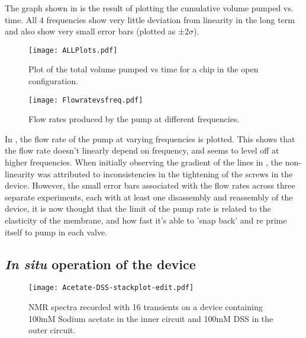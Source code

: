 The graph shown in  is the result of plotting the cumulative volume pumped
vs. time. All 4 frequencies show very little deviation from linearity in the
long term and also show very small error bars (plotted as ±2$\sigma$).

\begin{figure}[ht]
  \begin{center}
  \texttt{[image: ALLPlots.pdf]}
  \caption{Plot of the total volume pumped vs time for a chip in the open
  configuration.}
  \label{fig:Graph}
  \end{center}
\end{figure}

\begin{figure}[ht]
  \begin{center}
  \texttt{[image: Flowratevsfreq.pdf]}
  \caption{Flow rates produced by the pump at different frequencies.}
  \label{fig:FRvFGraph}
  \end{center}
\end{figure}

In , the flow rate of the pump at varying frequencies is plotted. This
shows that the flow rate doesn't linearly depend on frequency, and seems to level off at higher
frequencies. When initially observing the gradient of the lines in , the non-
linearity was attributed to inconsistencies in the tightening of the screws in the device.
However, the small error bars associated with the flow rates across three separate
experiments, each with at least one disassembly and reassembly of the device, it is now thought that the limit of the
pump rate is related to the elasticity of the membrane, and how fast it's able to 'snap
back' and re prime itself to pump in each valve.

\newpage
\newpage

\subsection{\textit{In situ} operation of the device}

\begin{figure}[ht]
  \begin{center}
  \texttt{[image: Acetate-DSS-stackplot-edit.pdf]}
  \caption{NMR spectra recorded with 16 transients on a device containing 100mM Sodium
  acetate in the inner circuit and 100mM DSS in the outer circuit.}
  \label{fig:spectra}
  \end{center}
\end{figure}

